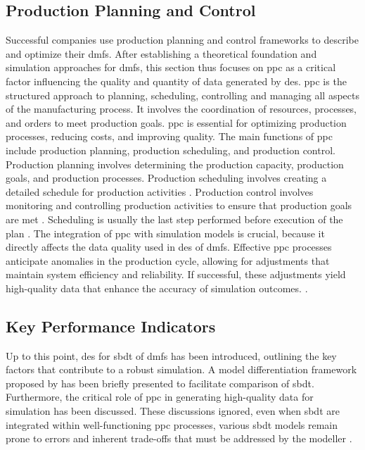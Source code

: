 \subsection{Production Planning and Control}
\label{sec:ppc}
Successful companies use production planning and control frameworks to describe and optimize their \gls{dmfs}. After establishing a theoretical foundation and simulation approaches for \gls{dmfs}, this section thus focuses on \gls{ppc} as a critical factor influencing the quality and quantity of data generated by \gls{des}.
\gls{ppc} is the structured approach to planning, scheduling, controlling and managing all aspects of the manufacturing process. It involves the coordination of resources, processes, and orders to meet production goals. \gls{ppc} is essential for optimizing production processes, reducing costs, and improving quality. The main functions of \gls{ppc} include production planning, production scheduling, and production control. Production planning involves determining the production capacity, production goals, and production processes. Production scheduling involves creating a detailed schedule for production activities \autocite{kasper2024designing}. Production control involves monitoring and controlling production activities to ensure that production goals are met \autocite{kiran2019production}. Scheduling is usually the last step performed before execution of the plan \autocite{pinedo2012design}. The integration of \gls{ppc} with simulation models is crucial, because it directly affects the data quality used in \gls{des} of \gls{dmfs}. Effective \gls{ppc} processes anticipate anomalies in the production cycle, allowing for adjustments that maintain system efficiency and reliability. If successful, these adjustments yield high-quality data that enhance the accuracy of simulation outcomes. \autocite{kiran2019production}.


\subsection{Key Performance Indicators}
\label{sec:relevant-kpis}
Up to this point, \gls{des} for \gls{sbdt} of \gls{dmfs} has been introduced, outlining the key factors that contribute to a robust simulation. A model differentiation framework proposed by \textcite*{Schwede2024} has been briefly presented to facilitate comparison of \gls{sbdt}. Furthermore, the critical role of \gls{ppc} in generating high-quality data for simulation has been discussed. These discussions ignored, even when \gls{sbdt} are integrated within well-functioning \gls{ppc} processes, various \gls{sbdt} models remain prone to errors and inherent trade-offs that must be addressed by the modeller \autocite{Tao2018ijamt}.

